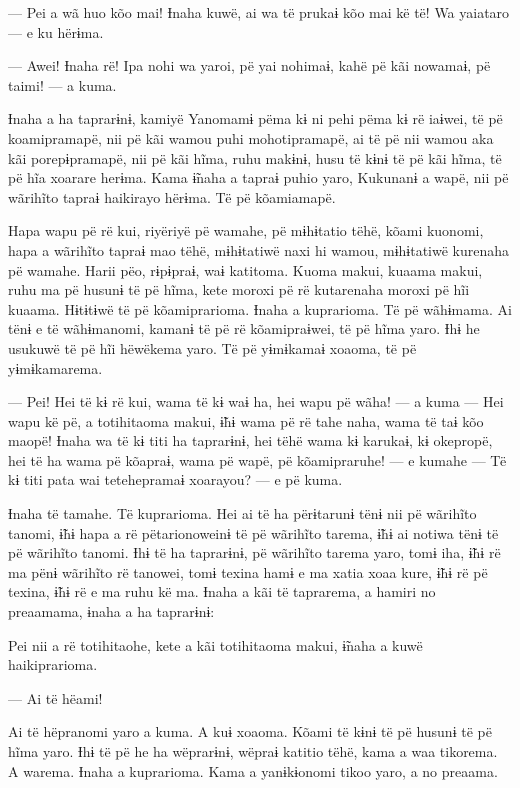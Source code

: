 --- Pei a wã huo kõo mai! Ɨnaha kuwë, ai wa të prukaɨ kõo mai kë të! Wa
yaiataro --- e ku hërɨma. 

--- Awei! Ɨnaha rë! Ipa nohi wa yaroi, pë yai nohimaɨ, kahë pë kãi
nowamaɨ, pë taimi! --- a kuma. 

Ɨnaha a ha taprarɨnɨ, kamiyë Yanomamɨ pëma kɨ ni pehi pëma kɨ rë iaɨwei,
të pë koamipramapë, nii pë kãi wamou puhi mohotipramapë, ai të pë nii
wamou aka kãi porepɨpramapë, nii pë kãi hĩma, ruhu makɨnɨ, husu të kɨnɨ
të pë kãi hĩma, të pë hĩa xoarare herɨma. Kama ɨ̃naha a tapraɨ puhio
yaro, Kukunanɨ a wapë, nii pë wãrihĩto tapraɨ haikirayo hërɨma. Të pë
kõamiamapë. 

Hapa wapu pë rë kui, riyëriyë pë wamahe, pë mɨhɨtatio tëhë, kõami
kuonomi, hapa a wãrihĩto tapraɨ mao tëhë, mɨhɨtatiwë naxi hi wamou,
mɨhɨtatiwë kurenaha pë wamahe. Harii pëo, rɨpɨpraɨ, waɨ katitoma. Kuoma
makui, kuaama makui, ruhu ma pë husunɨ të pë hĩma, kete moroxi pë rë
kutarenaha moroxi pë hĩi kuaama. Hɨtɨtɨwë të pë kõamiprarioma. Ɨnaha a
kuprarioma. Të pë wãhɨmama. Ai tënɨ e të wãhɨmanomi, kamanɨ të pë rë
kõamipraɨwei, të pë hĩma yaro. Ɨhɨ he usukuwë të pë hĩi hëwëkema yaro.
Të pë yɨmɨkamaɨ xoaoma, të pë yɨmɨkamarema. 

--- Pei! Hei të kɨ rë kui, wama të kɨ waɨ ha, hei wapu pë wãha! --- a kuma
--- Hei wapu kë pë, a totihitaoma makui, ɨ̃hɨ wama pë rë tahe naha, wama
të taɨ kõo maopë! Ɨnaha wa të kɨ titi ha taprarɨnɨ, hei tëhë wama kɨ
karukaɨ, kɨ okepropë, hei të ha wama pë kõapraɨ, wama pë wapë, pë
kõamipraruhe! --- e kumahe --- Të kɨ titi pata wai tetehepramaɨ
xoarayou? --- e pë kuma. 

Ɨnaha të tamahe. Të kuprarioma. Hei ai të ha përɨtarunɨ tënɨ nii pë
wãrihĩto tanomi, ɨ̃hɨ hapa a rë pëtarionoweinɨ të pë wãrihĩto tarema, ɨ̃hɨ
ai notiwa tënɨ të pë wãrihĩto tanomi. Ɨhɨ të ha taprarɨnɨ, pë wãrihĩto
tarema yaro, tomɨ iha, ɨ̃hɨ rë ma pënɨ wãrihĩto rë tanowei, tomɨ texina
hamɨ e ma xatia xoaa kure, ɨ̃hɨ rë pë texina, ɨ̃hɨ rë e ma ruhu kë ma.
Ɨnaha a kãi të taprarema, a hamiri no preaamama, ɨnaha a ha taprarɨnɨ:

Pei nii a rë totihitaohe, kete a kãi totihitaoma makui, ɨ̃naha a kuwë
haikiprarioma. 

--- Ai të hëami! 

Ai të hëpranomi yaro a kuma. A kuɨ xoaoma. Kõami të kɨnɨ të pë husunɨ të
pë hĩma yaro. Ɨhɨ të pë he ha wëprarɨnɨ, wëpraɨ katitio tëhë, kama a waa
tikorema. A warema. Ɨnaha a kuprarioma. Kama a yanɨkɨonomi tikoo yaro, a
no preaama.

